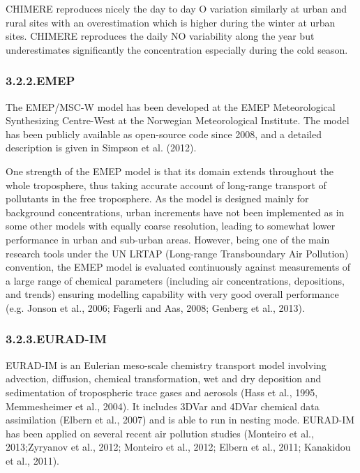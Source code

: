 \documentclass[9pt]{report}
\begin{document}
CHIMERE reproduces nicely the day to day O variation similarly at urban and rural sites with an overestimation which is higher during the winter at urban sites. 
CHIMERE reproduces the daily NO variability along the year but underestimates significantly the concentration especially during the cold season.%

\subsubsection{3.2.2.\hspace*{0.5em}EMEP}\label{sec-emep}%

\noindent{}The EMEP/MSC-W model has been developed at the EMEP Meteorological Synthesizing Centre-West at the Norwegian Meteorological Institute. 
The model has been publicly available as open-source code since 2008, and a detailed description is given in Simpson et al. (2012).%

 One strength of the EMEP model is that its domain extends throughout the whole troposphere, thus taking accurate account of long-range transport of pollutants in the free troposphere. 
 As the model is designed mainly for background concentrations, urban increments have not been implemented as in some other models with equally coarse resolution, leading to somewhat lower performance in urban and sub-urban areas. 
 However, being one of the main research tools under the UN LRTAP (Long-range Transboundary Air Pollution) convention, the EMEP model is evaluated continuously against measurements of a large range of chemical parameters (including air concentrations, depositions, and trends) ensuring modelling capability with very good overall performance (e.g. Jonson et al., 2006; Fagerli and Aas, 2008; Genberg et al., 2013).%

\subsubsection{3.2.3.\hspace*{0.5em}EURAD-IM}\label{sec-eurad-im}%

\noindent{}EURAD-IM is an Eulerian meso-scale chemistry transport model involving advection, diffusion, chemical transformation, wet and dry deposition and sedimentation of tropospheric trace gases and aerosols (Hass et al., 1995, Memmesheimer et al., 2004). It includes 3DVar and 4DVar chemical data assimilation (Elbern et al., 2007) and is able to run in nesting mode.
EURAD-IM has been applied on several recent air pollution studies (Monteiro et al., 2013;Zyryanov et al., 2012; Monteiro et al., 2012; Elbern et al., 2011; Kanakidou et al., 2011).%
\end{document}
